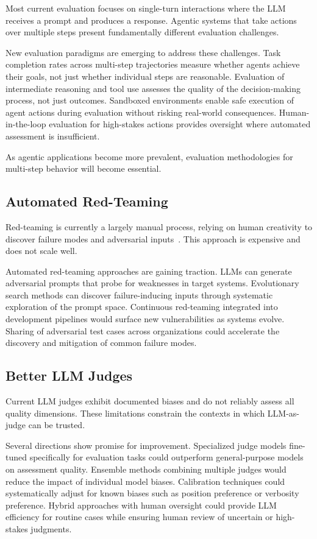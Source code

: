 Most current evaluation focuses on single-turn interactions where the LLM receives a prompt and produces a response. Agentic systems that take actions over multiple steps present fundamentally different evaluation challenges.

New evaluation paradigms are emerging to address these challenges. Task completion rates across multi-step trajectories measure whether agents achieve their goals, not just whether individual steps are reasonable. Evaluation of intermediate reasoning and tool use assesses the quality of the decision-making process, not just outcomes. Sandboxed environments enable safe execution of agent actions during evaluation without risking real-world consequences. Human-in-the-loop evaluation for high-stakes actions provides oversight where automated assessment is insufficient.

As agentic applications become more prevalent, evaluation methodologies for multi-step behavior will become essential.

\subsection{Automated Red-Teaming}

Red-teaming is currently a largely manual process, relying on human creativity to discover failure modes and adversarial inputs~\citep{perez2022red, ganguli2022red}. This approach is expensive and does not scale well.

Automated red-teaming approaches are gaining traction. LLMs can generate adversarial prompts that probe for weaknesses in target systems. Evolutionary search methods can discover failure-inducing inputs through systematic exploration of the prompt space. Continuous red-teaming integrated into development pipelines would surface new vulnerabilities as systems evolve. Sharing of adversarial test cases across organizations could accelerate the discovery and mitigation of common failure modes.

\subsection{Better LLM Judges}

Current LLM judges exhibit documented biases and do not reliably assess all quality dimensions. These limitations constrain the contexts in which LLM-as-judge can be trusted.

Several directions show promise for improvement. Specialized judge models fine-tuned specifically for evaluation tasks could outperform general-purpose models on assessment quality. Ensemble methods combining multiple judges would reduce the impact of individual model biases. Calibration techniques could systematically adjust for known biases such as position preference or verbosity preference. Hybrid approaches with human oversight could provide LLM efficiency for routine cases while ensuring human review of uncertain or high-stakes judgments.

